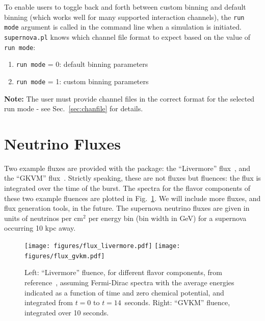 \documentclass{article}
\begin{document}
To enable users to toggle back and forth between custom binning and default binning (which works well for many supported interaction channels), the \texttt{run mode} argument is called in the command line when a simulation is initiated. \texttt{supernova.pl} knows which channel file format to expect based on the value of \texttt{run mode}:

\begin{adjustwidth}{2cm}{}
    \begin{enumerate}
        \item \texttt{run mode} = 0: default binning parameters
        \item \texttt{run mode} = 1: custom binning parameters
    \end{enumerate}
\end{adjustwidth}

\noindent \textbf{Note:} The user must provide channel files in the correct format for the selected run mode - see Sec.~\ref{sec:chanfile} for details.

\section{Neutrino Fluxes}\label{sec:flux.files}

Two example fluxes are provided with the package: the ``Livermore'' flux~\cite{Totani:1997vj}, and the ``GKVM'' flux~\cite{Gava:2009pj}. Strictly speaking, these are not fluxes but fluences: the flux is integrated over the time of the burst. The spectra for the flavor components of these two example fluences are plotted in Fig.~\ref{fig:fluxes}. We will include more fluxes, and flux generation tools, in the future. The supernova neutrino fluxes are given in units of neutrinos per cm$^{2}$ per energy bin (bin width in GeV) for a supernova occurring 10 kpc away.


\begin{figure}[h]
\texttt{[image: figures/flux\_livermore.pdf]}
\texttt{[image: figures/flux\_gvkm.pdf]}

\caption{Left: ``Livermore'' fluence, for different flavor components,
  from reference~\cite{Totani:1997vj}, assuming Fermi-Dirac spectra with
  the average energies indicated as a function of time and zero
  chemical potential, and integrated from $t=0$ to $t=14$~seconds.  Right: ``GVKM'' fluence, integrated over 10
  seconds.}\label{fig:fluxes}
\end{figure}
\end{document}
